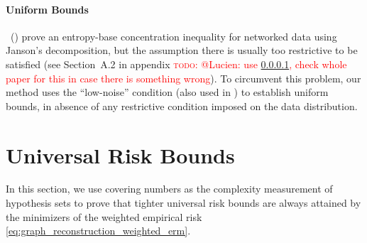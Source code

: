 \documentclass[letterpaper]{article} %
\newcommand{\red}[1]{\textcolor{red}{#1}}
\newcommand{\todo}[1]{\red{\textsc{todo:} #1}}
\newcommand{\citet}[1]{\citeauthor{#1}\ (\citeyear{#1})}
\newcommand{\citep}[3]{(#1\ \citeauthor{#3}\ \citeyear{#3},\ #2)}
\begin{document}
\paragraph{Uniform Bounds} 
\citet{DBLP:conf/icml/RalaivolaA15} prove an entropy-base concentration inequality for networked data using Janson's decomposition, but the 
assumption there is usually too restrictive to be satisfied %
(see Section~A.2 in appendix \todo{@Lucien: use \ref{}, check whole paper for this in case there is something wrong}). 
To circumvent this problem, our method uses 
the ``low-noise'' condition (also used in \cite{papa2016graph}) to establish uniform bounds, 
in absence of any restrictive condition imposed on the data distribution. 



\section{Universal Risk Bounds} %
\label{sec:risk_bounds}
In this section, we use covering numbers as the complexity measurement of hypothesis sets to prove that tighter universal risk bounds are always attained by the minimizers of the weighted empirical risk \eqref{eq:graph_reconstruction_weighted_erm}.
\end{document}
